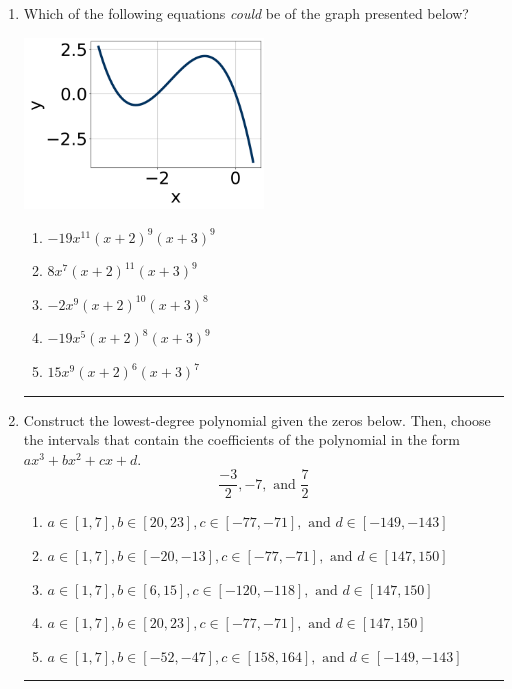 \documentclass[14pt]{extbook}
\newcommand{\litem}[1]{\item#1\hspace*{-1cm}\rule{\textwidth}{0.4pt}}
\begin{document}
\begin{enumerate}
\litem{
Which of the following equations \textit{could} be of the graph presented below?
\begin{center}
    \includegraphics[width=0.5\textwidth]{../Figures/polyGraphToFunctionA.png}
\end{center}
\begin{enumerate}[label=\Alph*.]
\item \( -19x^{11} (x + 2)^{9} (x + 3)^{9} \)
\item \( 8x^{7} (x + 2)^{11} (x + 3)^{9} \)
\item \( -2x^{9} (x + 2)^{10} (x + 3)^{8} \)
\item \( -19x^{5} (x + 2)^{8} (x + 3)^{9} \)
\item \( 15x^{9} (x + 2)^{6} (x + 3)^{7} \)

\end{enumerate} }
\litem{
Construct the lowest-degree polynomial given the zeros below. Then, choose the intervals that contain the coefficients of the polynomial in the form $ax^3+bx^2+cx+d$.\[ \frac{-3}{2}, -7, \text{ and } \frac{7}{2} \]\begin{enumerate}[label=\Alph*.]
\item \( a \in [1, 7], b \in [20, 23], c \in [-77, -71], \text{ and } d \in [-149, -143] \)
\item \( a \in [1, 7], b \in [-20, -13], c \in [-77, -71], \text{ and } d \in [147, 150] \)
\item \( a \in [1, 7], b \in [6, 15], c \in [-120, -118], \text{ and } d \in [147, 150] \)
\item \( a \in [1, 7], b \in [20, 23], c \in [-77, -71], \text{ and } d \in [147, 150] \)
\item \( a \in [1, 7], b \in [-52, -47], c \in [158, 164], \text{ and } d \in [-149, -143] \)


\end{enumerate}}
\end{enumerate}
\end{document}
